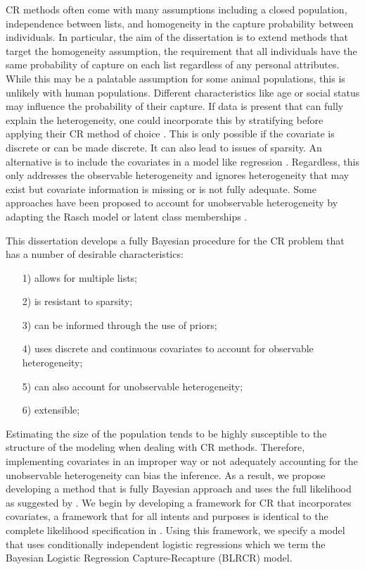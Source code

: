 \documentclass[
  12pt,
]{article}
\begin{document}
CR methods often come with many assumptions including a closed
population, independence between lists, and homogeneity in the capture
probability between individuals. In particular, the aim of the
dissertation is to extend methods that target the homogeneity
assumption, the requirement that all individuals have the same
probability of capture on each list regardless of any personal
attributes. While this may be a palatable assumption for some animal
populations, this is unlikely with human populations. Different
characteristics like age or social status may influence the probability
of their capture. If data is present that can fully explain the
heterogeneity, one could incorporate this by stratifying before applying
their CR method of choice
\citep{sekar_method_1949,manrique-vallier_estimating_2019}. This is only
possible if the covariate is discrete or can be made discrete. It can
also lead to issues of sparsity. An alternative is to include the
covariates in a model like regression
\citep{alho_logistic_1990,baker_simple_1990,bonner_mcmcmc_2014,king_capturerecapture_2016}.
Regardless, this only addresses the observable heterogeneity and ignores
heterogeneity that may exist but covariate information is missing or is
not fully adequate. Some approaches have been proposed to account for
unobservable heterogeneity by adapting the Rasch model
\citep{darroch_three-sample_1993} or latent class memberships
\citep{manriquevallier_bayesian_2016}.

This dissertation develops a fully Bayesian procedure for the CR problem
that has a number of desirable characteristics:

\begin{itemize}

\item[1)] allows for multiple lists;
\item[2)] is resistant to sparsity;
\item[3)] can be informed through the use of priors;
\item[4)] uses discrete and continuous covariates to account for observable heterogeneity;
\item[5)] can also account for unobservable heterogeneity;
\item[6)] extensible;

\end{itemize}

Estimating the size of the population tends to be highly susceptible to
the structure of the modeling when dealing with CR methods. Therefore,
implementing covariates in an improper way or not adequately accounting
for the unobservable heterogeneity can bias the inference. As a result,
we propose developing a method that is fully Bayesian approach and uses
the full likelihood as suggested by \cite{pollock_use_2002}. We begin by
developing a framework for CR that incorporates covariates, a framework
that for all intents and purposes is identical to the complete
likelihood specification in \citep{king_capturerecapture_2016}. Using
this framework, we specify a model that uses conditionally independent
logistic regressions which we term the Bayesian Logistic Regression
Capture-Recapture (BLRCR) model.
\end{document}
